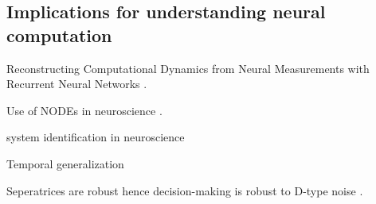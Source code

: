 \documentclass{article}
\theoremstyle{definition} \newtheorem{definition}{Definition}
\theoremstyle{remark} \newtheorem{remark}{Remark}
\newcounter{ct}
\begin{document}
\subsection{Implications for understanding neural computation} 
Reconstructing Computational Dynamics from Neural Measurements with Recurrent Neural Networks \citep{durstewitz2023reconstructing}.

Use of NODEs in neuroscience \citep{kim2021inferring}.

system identification in neuroscience \citep{han2023si} 

Temporal generalization

Seperatrices are robust hence decision-making is robust to D-type noise \citep{Park2023a}.












\newpage





\newpage
\appendix 
\end{document}
